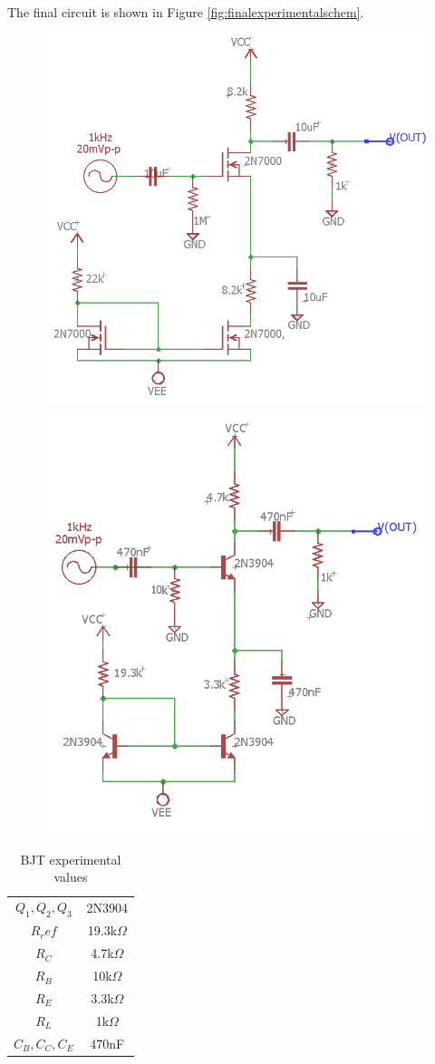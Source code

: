 
The final circuit is shown in Figure \ref{fig:finalexperimentalschem}.

\begin{figure}
	\centering
	\includegraphics[width=0.7\linewidth]{ExperimentalImplementation/NMOS_exp}
	\caption[NMOS final circuit schematic]{}
	\caption{}
	\label{fig:nmosexp}
\end{figure}


\begin{figure}
	\centering
	\includegraphics[width=0.7\linewidth]{ExperimentalImplementation/BJT_Exp}
	\caption[BJT final schematic]{}
	\caption{}
	\label{fig:bjtexp}
\end{figure}


\begin{table}[]
	\centering
	\caption{BJT experimental values}
	\label{my-label}
	\begin{tabular}{cc}
		$Q_1, Q_2, Q_3$ & 2N3904        \\
		$R_ref$         & 19.3k$\Omega$ \\
		$R_C$           & 4.7k$\Omega$  \\
		$R_B$           & 10k$\Omega$   \\
		$R_E$           & 3.3k$\Omega$  \\
		$R_L$           & 1k$\Omega$    \\
		$C_B, C_C, C_E$ & 470nF        
	\end{tabular}
\end{table}

